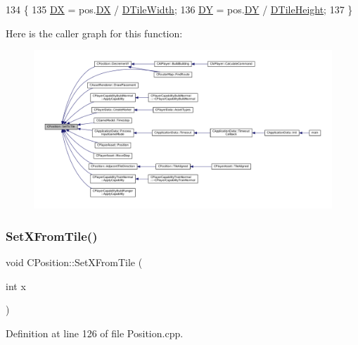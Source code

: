 \begin{DoxyCode}
134                                              \{
135     \hyperlink{classCPosition_a28445f9b872169715919074d82044eda}{DX} = pos.\hyperlink{classCPosition_a28445f9b872169715919074d82044eda}{DX} / \hyperlink{classCPosition_ac17d12fb5d35fcf62d63bb42e8cf7ed6}{DTileWidth};
136     \hyperlink{classCPosition_a84139c9e8eb547e7cf3cb851739943a4}{DY} = pos.\hyperlink{classCPosition_a84139c9e8eb547e7cf3cb851739943a4}{DY} / \hyperlink{classCPosition_a202ebb83e86df75cfb76cf1241ba817c}{DTileHeight};
137 \}
\end{DoxyCode}
Here is the caller graph for this function\+:\nopagebreak
\begin{figure}[H]
\begin{center}
\leavevmode
\includegraphics[width=350pt]{classCPosition_ae302aa21792de64c97de29e2cbbfeb94_icgraph}
\end{center}
\end{figure}
\hypertarget{classCPosition_ac6a1eeaeb98e20942efea7cf253b2ec4}{}\label{classCPosition_ac6a1eeaeb98e20942efea7cf253b2ec4} 
\subsubsection{\texorpdfstring{Set\+X\+From\+Tile()}{SetXFromTile()}}
{\footnotesize\ttfamily void C\+Position\+::\+Set\+X\+From\+Tile (\begin{DoxyParamCaption}\item[{int}]{x }\end{DoxyParamCaption})}



Definition at line 126 of file Position.\+cpp.


